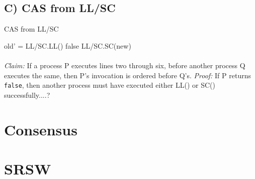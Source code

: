\documentclass[11pt]{article}
\begin{document}
\subsection*{C) CAS from LL/SC} 
\begin{algorithm}
    \caption{CAS from LL/SC}
    \begin{algorithmic}[1]
            \State old' = LL/SC.LL()
                \State \Return false
            \Else
                \State \Return LL/SC.SC(new)
            \EndIf
        \EndFunction
    \end{algorithmic}
\end{algorithm}
\paragraph{} \textit{Claim:} If a process P executes lines two through six, before another process Q executes the same, then P's invocation is ordered before Q's. \textit{Proof:} If P returns \texttt{false}, then another process must have executed either LL() or SC() successfully....?

\section{Consensus}

\section{SRSW}
\end{document}
